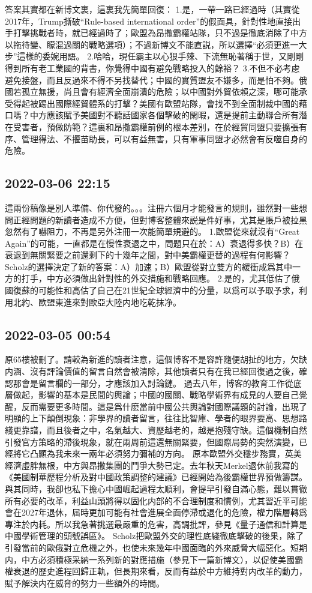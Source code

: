 \documentclass[twocolumn]{ctexart}
\begin{document}
答案其實都在新博文裏，這裏我先簡單回復：
1.是，一帶一路已經過時（其實從2017年，Trump撕破“Rule-based international order”的假面具，針對性地直接出手打擊挑戰者時，就已經過時了；歐盟為昂撒霸權站隊，只不過是徹底消除了中方以拖待變、矇混過關的戰略選項）；不過新博文不能直説，所以選擇“必須更進一大步”這樣的委婉用語。
2.哈哈，現任霸主以心狠手辣、下流無恥著稱于世，又剛剛得到所有老工業國的背書，你覺得中國有避免戰略投入的餘裕？
3.不但不必考慮避免接盤，而且反過來不得不另找替代；中國的實質盟友不嫌多，而是怕不夠。俄國若孤立無援，尚且會有經濟全面崩潰的危險；以中國對外貿依賴之深，哪可能承受得起被踢出國際經貿體系的打擊？美國有歐盟站隊，會找不到全面制裁中國的藉口嗎？中方應該賦予美國對不聽話國家各個擊破的閑暇，還是提前主動聯合所有潛在受害者，預做防範？這裏和昂撒霸權前例的根本差別，在於經貿同盟只要擴張有序、管理得法、不揠苗助長，可以有益無害，只有軍事同盟才必然會有反噬自身的危險。
\subsection*{2022-03-06 22:15}

這兩份稿像是別人準備、你代發的。。。注冊六個月才能發言的規則，雖然對一些想問正經問題的新讀者造成不方便，但對博客整體來説是件好事，尤其是賬戶被拉黑忽然有了嚇阻力，不再是另外注冊一次能簡單規避的。
1.歐盟從來就沒有“Great Again”的可能，一直都是在慢性衰退之中，問題只在於：A）衰退得多快？B）在衰退到無關緊要之前還剩下的十幾年之間，對中美霸權更替的過程有何影響？Scholz的選擇決定了新的答案：A）加速；B）歐盟從對立雙方的緩衝成爲其中一方的打手，中方必須做出針對性的外交措施和戰略回應。
2.是的，尤其低估了俄國復蘇的可能性和高估了自己在21世紀全球經濟中的分量，以爲可以予取予求，利用北約、歐盟東進來對歐亞大陸内地吃乾抹净。
\subsection*{2022-03-05 00:54}

原65樓被刪了。請較為新進的讀者注意，這個博客不是容許隨便胡扯的地方，欠缺内涵、沒有評論價值的留言自然會被清除，其他讀者只有在我已經回復過之後，確認那會是留言欄的一部分，才應該加入討論鏈。
過去八年，博客的教育工作從底層做起，影響的基本是民間的輿論；中國的國關、戰略學術界有成見的人要自己覺醒，反而需要更多時間。這是爲什麽當前中國公共輿論對國際議題的討論，出現了明顯的上下顛倒現象：非學界的讀者留言，往往比智庫、學者的眼界要高、思想路綫更靠譜，而且後者之中，名氣越大、資歷越老的，越是抱殘守缺。這個機制自然引發官方策略的滯後現象，就在兩周前這還無關緊要，但國際局勢的突然演變，已經將它凸顯為我未來一兩年必須努力彌補的方向。
原本歐盟外交穩步務實，英美經濟虛胖無根，中方與昂撒集團的鬥爭大勢已定。去年秋天Merkel退休前我寫的《美國制華歷程分析及對中國政策調整的建議》已經開始為後霸權世界預做籌謀。與其同時，我卻也私下擔心中國崛起過程太順利，會提早引發自滿心態，難以貫徹所有必要的改革，利益山頭將得以固化内部的不合理制度和慣例，尤其習近平可能會在2027年退休，届時更加可能有社會進展全面停滯或退化的危險，權力階層轉爲專注於内耗。所以我急著挑選最嚴重的危害，高調批評，參見《量子通信和計算是中國學術管理的頭號誤區》。
Scholz把歐盟外交的理性底綫徹底擊破的後果，除了引發當前的歐俄對立危機之外，也使未來幾年中國面臨的外來威脅大幅惡化。短期内，中方必須積極采納一系列新的對應措施（參見下一篇新博文），以促使美國霸權衰退的歷史進程回歸正軌，但長期來看，反而有益於中方維持對内改革的動力，賦予解決内在威脅的努力一些額外的時間。
\end{document}
